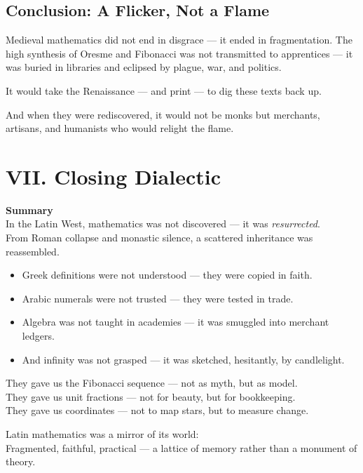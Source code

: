\documentclass[9pt]{article}
\begin{document}
\subsection*{Conclusion: A Flicker, Not a Flame}

Medieval mathematics did not end in disgrace — it ended in fragmentation.  
The high synthesis of Oresme and Fibonacci was not transmitted to apprentices — it was buried in libraries and eclipsed by plague, war, and politics.

It would take the Renaissance — and print — to dig these texts back up.

And when they were rediscovered, it would not be monks but merchants, artisans, and humanists who would relight the flame.


\newpage

\section*{VII. Closing Dialectic}

\textbf{Summary} \\

In the Latin West, mathematics was not discovered --- it was \textit{resurrected}. \\

From Roman collapse and monastic silence, a scattered inheritance was reassembled.

\begin{itemize}
    \item Greek definitions were not understood --- they were copied in faith.
    \item Arabic numerals were not trusted --- they were tested in trade.
    \item Algebra was not taught in academies --- it was smuggled into merchant ledgers.
    \item And infinity was not grasped --- it was sketched, hesitantly, by candlelight.
\end{itemize}

They gave us the Fibonacci sequence --- not as myth, but as model. \\

They gave us unit fractions --- not for beauty, but for bookkeeping. \\

They gave us coordinates --- not to map stars, but to measure change.

Latin mathematics was a mirror of its world: \\
Fragmented, faithful, practical --- a lattice of memory rather than a monument of theory.
\end{document}
